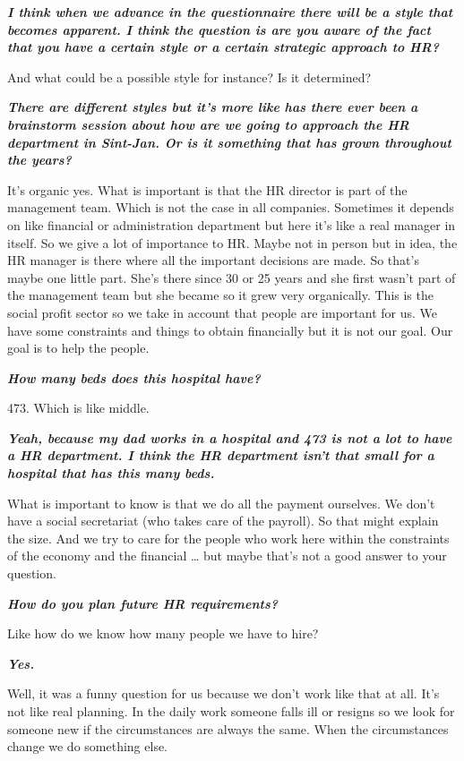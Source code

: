 \documentclass[a4paper,fleqn,11pt,dvips,titlepage]{article}
\newcommand{\question}[1]{\textbf{\textit{#1}}}
\numberwithin{figure}{section}
\numberwithin{equation}{section}
\begin{document}
\question{I think when we advance in the questionnaire there will be a style that becomes apparent. I think the question is are you aware of the fact that you have a certain style or a certain strategic approach to HR? }

And what could be a possible style for instance? Is it determined? 

\question{There are different styles but it’s more like has there ever been a brainstorm session about how are we going to approach the HR department in Sint-Jan. Or is it something that has grown throughout the years? }

It’s organic yes. What is important is that the HR director is part of the management team. Which is not the case in all companies. Sometimes it depends on like financial or administration department but here it’s like a real manager in itself. So we give a lot of importance to HR. Maybe not in person but in idea, the HR manager is there where all the important decisions are made. So that’s maybe one little part. She’s there since 30 or 25 years and she first wasn’t part of the management team but she became so it grew very organically. This is the social profit sector so we take in account that people are important for us. We have some constraints and things to obtain financially but it is not our goal. Our goal is to help the people.  

\question{How many beds does this hospital have? }

473. Which is like middle. 

\question{Yeah, because my dad works in a hospital and 473 is not a lot to have a HR department. I think the HR department isn’t that small for a hospital that has this many beds. }

What is important to know is that we do all the payment ourselves. We don’t have a social secretariat (who takes care of the payroll). So that might explain the size. And we try to care for the people who work here within the constraints of the economy and the financial … but maybe that’s not a good answer to your question. 

\question{How do you plan future HR requirements? }

Like how do we know how many people we have to hire? 

\question{Yes.}

Well, it was a funny question for us because we don’t work like that at all. It’s not like real planning. In the daily work someone falls ill or resigns so we look for someone new if the circumstances are always the same. When the circumstances change we do something else. 
\end{document}
